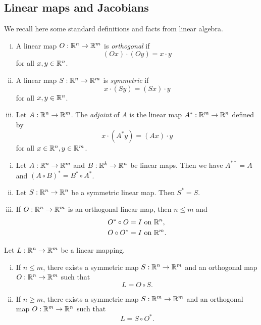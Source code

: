 \subsection{Linear maps and Jacobians}

We recall here some standard definitions and facts from linear algebra.

\begin{definition} \hfill
\begin{enumerate}[i)]
\item A linear map $O : \mathbb{R}^{n} \to \mathbb{R}^{m}$ is {\em orthogonal} if $$(Ox) \cdot (Oy) = x \cdot y$$ for all $x, y \in \mathbb{R}^{n}$.
\item A linear map $S: \mathbb{R}^{n} \to \mathbb{R}^{m}$ is {\em symmetric} if $$x \cdot (Sy) = (Sx) \cdot y$$ for all $x, y \in \mathbb{R}^{n}$.
\item Let $A: \mathbb{R}^{n} \to \mathbb{R}^{m}$. The {\em adjoint} of $A$ is the linear map $A^{*}: \mathbb{R}^{m} \to \mathbb{R}^{n}$ defined by $$x \cdot (A^{*} y) = (Ax) \cdot y$$ for all $x \in \mathbb{R}^{n}, y \in \mathbb{R}^{m}$. 
\end{enumerate}
\end{definition}

\begin{proposition} \label{prop:properties_linear} \hfill
\begin{enumerate}[i)]
\item Let $A: \mathbb{R}^{n} \to \mathbb{R}^{m}$ and $B: \mathbb{R}^{k} \to \mathbb{R}^{n}$ be linear maps. Then we have $A^{**} = A$ and $(A \circ B)^{*} = B^{*} \circ A^{*}$.
\item Let $S : \mathbb{R}^{n} \to \mathbb{R}^{n}$ be a symmetric linear map. Then $S^{*} = S$.
\item If $O : \mathbb{R}^{n} \to \mathbb{R}^{m}$ is an orthogonal linear map, then $n \le m$ and 
\begin{align*}
O^{*} \circ O = I & \text{ on } \mathbb{R}^{n}, \\
O \circ O^{*} = I & \text{ on } \mathbb{R}^{m}.
\end{align*}
\end{enumerate}
\end{proposition}

\begin{theorem} \label{thm:polar_decomposition_map}
Let $L: \mathbb{R}^{n} \to \mathbb{R}^{m}$ be a linear mapping.
\begin{enumerate}[i)]
\item If $n \le m$, there exists a symmetric map $S: \mathbb{R}^{n} \to \mathbb{R}^{m}$ and an orthogonal map $O: \mathbb{R}^{n} \to \mathbb{R}^{m}$ such that $$L = O \circ S.$$
\item If $n \ge m$, there exists a symmetric map $S: \mathbb{R}^{m} \to \mathbb{R}^{m}$ and an orthogonal map $O: \mathbb{R}^{m} \to \mathbb{R}^{n}$ such that $$L = S \circ O^{*}.$$
\end{enumerate}
\end{theorem}

